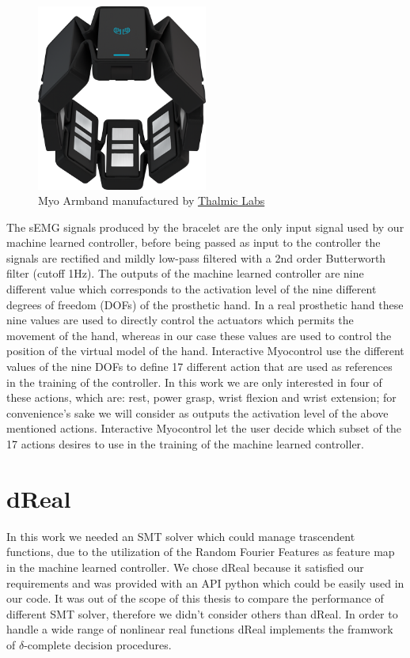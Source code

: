 \begin{figure}[ht]
    \centering
    \includegraphics[width=0.5\textwidth]{Images/myo_armband.png}
    \caption{Myo Armband manufactured by \href{https://www.myo.com/techspecs}{Thalmic Labs}}
    \label{fig:myo_armband}
\end{figure}
The sEMG signals produced by the bracelet are the only input signal used by our machine learned controller, before being passed as input to the controller the signals are rectified and mildly low-pass filtered with a 2nd order Butterworth filter (cutoff 1Hz).
The outputs of the machine learned controller are nine different value which corresponds to the activation level of the nine different degrees of freedom (DOFs) of the prosthetic hand. In a real prosthetic hand these nine values are used to directly control the actuators which permits the movement of the hand, whereas in our case these values are used to control the position of the virtual model of the hand. Interactive Myocontrol use the different values of the nine DOFs to define 17 different action that are used as references in the training of the controller. In this work we are only interested in four of these actions, which are: rest, power grasp, wrist flexion and wrist extension; for convenience's sake we will consider as outputs the activation level of the above mentioned actions.
Interactive Myocontrol let the user decide which subset of the 17 actions desires to use in the training of the machine learned controller.
\section{dReal}\label{sec:dReal}
In this work we needed an SMT solver which could manage trascendent functions, due to the utilization of the Random Fourier Features as feature map in the machine learned controller. We chose dReal \cite{gao2013dreal} because it satisfied our requirements and was provided with an API python which could be easily used in our code. It was out of the scope of this thesis to compare the performance of different SMT solver, therefore we didn't consider others than dReal.
In order to handle a wide range of nonlinear real functions dReal implements the framwork of $\delta$-complete decision procedures. 